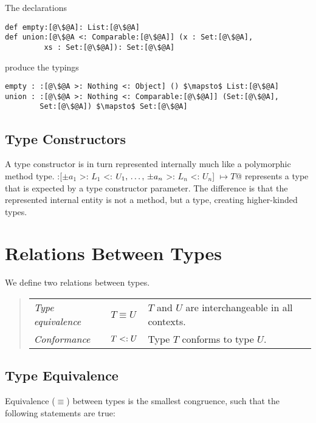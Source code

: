 \example The declarations
\begin{lstlisting}[escapechar=@,deletekeywords={union}]
def empty:[@\$@A]: List:[@\$@A]
def union:[@\$@A <: Comparable:[@\$@A]] (x : Set:[@\$@A], 
         xs : Set:[@\$@A]): Set:[@\$@A]
\end{lstlisting}
produce the typings
\begin{lstlisting}[escapechar=@,deletekeywords={union}]
empty : :[@\$@A >: Nothing <: Object] () $\mapsto$ List:[@\$@A]
union : :[@\$@A >: Nothing <: Comparable:[@\$@A]] (Set:[@\$@A], 
        Set:[@\$@A]) $\mapsto$ Set:[@\$@A]
\end{lstlisting}

\subsection{Type Constructors}
\label{sec:type-constructors}

A type constructor is in turn represented internally much like a polymorphic method type. \lstinline@:[$\pm a_1$ >: $L_1$ <: $U_1 ,\, \ldots ,\, \pm a_n$ >: $L_n$ <: $U_n$] $\mapsto T$@ represents a type that is expected by a type constructor parameter. The difference is that the represented internal entity is not a method, but a type, creating higher-kinded types. 

\section{Relations Between Types}

We define two relations between types. 
\begin{quote}\begin{tabular}{l@{\gap}l@{\gap}l}
\em Type equivalence & $T \equiv U$ & $T$ and $U$ are interchangeable
in all contexts.
\\
\em Conformance & $T <: U$ & Type $T$ conforms to type $U$.
\end{tabular}\end{quote}

\subsection{Type Equivalence}

Equivalence ($\equiv$) between types is the smallest congruence, such that the following statements are true:

